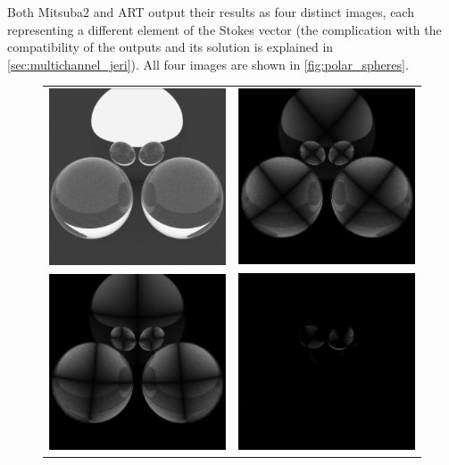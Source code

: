 Both Mitsuba2 and ART output their results as four distinct images, each representing a different element of the Stokes vector (the complication with the compatibility of the outputs and its solution is explained in \autoref{sec:multichannel_jeri}). All four images are shown in \autoref{fig:polar_spheres}.

\begin{figure}[h]
	\begin{tabular}{cc}
		\includegraphics[width=.45\linewidth]{img/polarizing_spheres.s0.png}
		&
		\includegraphics[width=.45\linewidth]{img/polarizing_spheres.s1.png} \\
		\includegraphics[width=.45\linewidth]{img/polarizing_spheres.s2.png}
		&
		\includegraphics[width=.45\linewidth]{img/polarizing_spheres.s3.png}

\end{tabular}
\end{figure}
